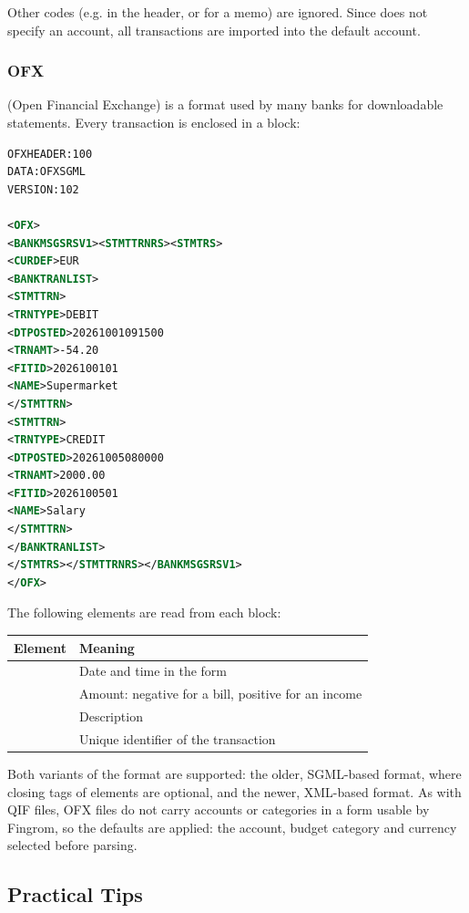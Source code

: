 \noindent Other codes (e.g.  in the header, or  for a memo) are ignored. Since
 does not specify an account, all transactions are imported into the default account.

\subsubsection{OFX}

 (Open Financial Exchange) is a format used by many banks for downloadable statements.
Every transaction is enclosed in a  block:

\begin{lstlisting}[language=xml, caption=Sample OFX File, label=code:import-ofx]
OFXHEADER:100
DATA:OFXSGML
VERSION:102

<OFX>
<BANKMSGSRSV1><STMTTRNRS><STMTRS>
<CURDEF>EUR
<BANKTRANLIST>
<STMTTRN>
<TRNTYPE>DEBIT
<DTPOSTED>20261001091500
<TRNAMT>-54.20
<FITID>2026100101
<NAME>Supermarket
</STMTTRN>
<STMTTRN>
<TRNTYPE>CREDIT
<DTPOSTED>20261005080000
<TRNAMT>2000.00
<FITID>2026100501
<NAME>Salary
</STMTTRN>
</BANKTRANLIST>
</STMTRS></STMTTRNRS></BANKMSGSRSV1>
</OFX>
\end{lstlisting}

\noindent The following elements are read from each block:

\begin{center}
\small
\begin{tabularx}{\textwidth}{|l|X|}
  \hline
  \textbf{Element} & \textbf{Meaning} \\
  \hline
  \q{DTPOSTED} & Date and time in the form \q{YYYYMMDDhhmmss} \\
  \q{TRNAMT} & Amount: negative for a bill, positive for an income \\
  \q{NAME} & Description \\
  \q{FITID} & Unique identifier of the transaction \\
  \hline
\end{tabularx}
\end{center}

\noindent Both variants of the format are supported: the older, SGML-based format, where
closing tags of elements are optional, and the newer, XML-based format. As with QIF files,
OFX files do not carry accounts or categories in a form usable by Fingrom, so the defaults
are applied: the account, budget category and currency selected before parsing.


\subsection{Practical Tips}

